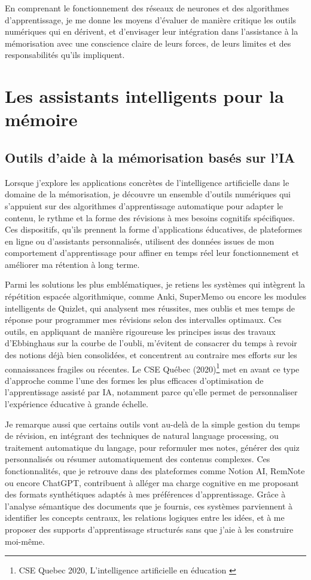 \documentclass[11pt,a4paper]{report}
\begin{document}
En comprenant le fonctionnement des réseaux de neurones et des algorithmes d’apprentissage, je me donne les moyens d’évaluer de manière critique les outils numériques qui en dérivent, et d’envisager leur intégration dans l’assistance à la mémorisation avec une conscience claire de leurs forces, de leurs limites et des responsabilités qu’ils impliquent.

\section{Les assistants intelligents pour la mémoire}

\subsection{Outils d’aide à la mémorisation basés sur l’IA}

Lorsque j’explore les applications concrètes de l’intelligence artificielle dans le domaine de la mémorisation, je découvre un ensemble d’outils numériques qui s’appuient sur des algorithmes d’apprentissage automatique pour adapter le contenu, le rythme et la forme des révisions à mes besoins cognitifs spécifiques. Ces dispositifs, qu’ils prennent la forme d’applications éducatives, de plateformes en ligne ou d’assistants personnalisés, utilisent des données issues de mon comportement d’apprentissage pour affiner en temps réel leur fonctionnement et améliorer ma rétention à long terme.

Parmi les solutions les plus emblématiques, je retiens les systèmes qui intègrent la répétition espacée algorithmique, comme Anki, SuperMemo ou encore les modules intelligents de Quizlet, qui analysent mes réussites, mes oublis et mes temps de réponse pour programmer mes révisions selon des intervalles optimaux. Ces outils, en appliquant de manière rigoureuse les principes issus des travaux d’Ebbinghaus sur la courbe de l’oubli, m’évitent de consacrer du temps à revoir des notions déjà bien consolidées, et concentrent au contraire mes efforts sur les connaissances fragiles ou récentes. Le CSE Québec (2020)\footnote{CSE Quebec 2020, L’intelligence artificielle en éducation \cite{hypotheses}} met en avant ce type d’approche comme l’une des formes les plus efficaces d’optimisation de l’apprentissage assisté par IA, notamment parce qu’elle permet de personnaliser l’expérience éducative à grande échelle.

Je remarque aussi que certains outils vont au-delà de la simple gestion du temps de révision, en intégrant des techniques de natural language processing, ou traitement automatique du langage, pour reformuler mes notes, générer des quiz personnalisés ou résumer automatiquement des contenus complexes. Ces fonctionnalités, que je retrouve dans des plateformes comme Notion AI, RemNote ou encore ChatGPT, contribuent à alléger ma charge cognitive en me proposant des formats synthétiques adaptés à mes préférences d’apprentissage. Grâce à l’analyse sémantique des documents que je fournis, ces systèmes parviennent à identifier les concepts centraux, les relations logiques entre les idées, et à me proposer des supports d’apprentissage structurés sans que j’aie à les construire moi-même.
\end{document}
